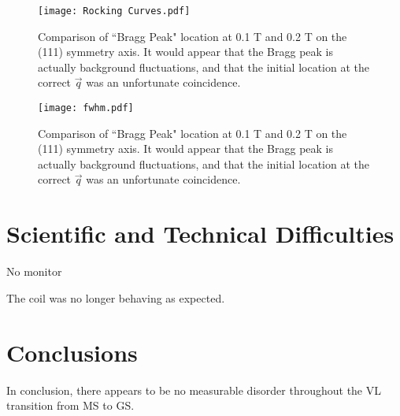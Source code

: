 \documentclass[aps, prl, reprint, groupedaddress, superscriptaddress, twocolumn]{revtex4-1}
\begin{document}
	
	\begin{figure}
		\texttt{[image: Rocking Curves.pdf]}
		\caption{\label{fig:RC} Comparison of ``Bragg Peak" location at 0.1 T and 0.2 T on the (111) symmetry axis.  It would appear that the Bragg peak is actually background fluctuations, and that the initial location at the correct $\vec{q}$ was an unfortunate coincidence.}
	\end{figure}
	
	\begin{figure}
		\texttt{[image: fwhm.pdf]}
		\caption{\label{fig:fwhm} Comparison of ``Bragg Peak" location at 0.1 T and 0.2 T on the (111) symmetry axis.  It would appear that the Bragg peak is actually background fluctuations, and that the initial location at the correct $\vec{q}$ was an unfortunate coincidence.}
	\end{figure}

		
\section{Scientific and Technical Difficulties}
No monitor

The coil was no longer behaving as expected.


\section{Conclusions}
In conclusion, there appears to be no measurable disorder throughout the VL transition from MS to GS.




\begin{thebibliography}{widest entry}

\end{thebibliography}
\end{document}
